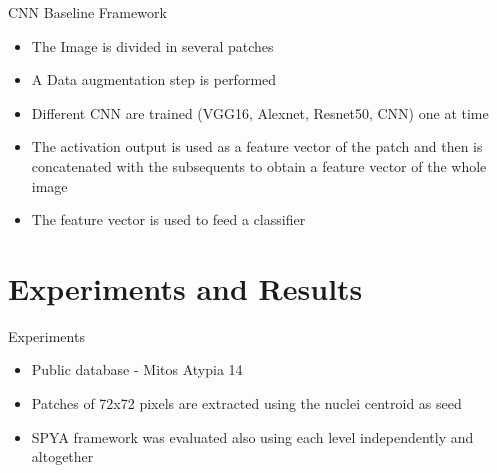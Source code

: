 \documentclass[usenames,dvipsnames]{beamer}
\begin{document}
\begin{frame}{CNN Baseline Framework}
\begin{itemize}
 \item The Image is divided in several patches
 \pause
 \item A Data augmentation step is performed

 \pause \item Different CNN are trained (VGG16, Alexnet, Resnet50, CNN) one at time
  \pause\item The activation output is used as a feature vector of the patch and then is concatenated with the subsequents to obtain a feature vector of the whole image
  \pause \item The feature vector is used to feed a classifier
\end{itemize}
\end{frame}

\section{Experiments and Results}

\begin{frame}{Experiments }
\begin{itemize}
\item Public database - Mitos Atypia 14
\item  Patches of 72x72 pixels are extracted using the nuclei centroid as seed
\item SPYA framework was evaluated also using each level independently and altogether

 
\end{itemize}

\end{frame}
\end{document}
